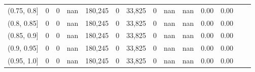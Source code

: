 \begin{tabular}{rrrrrrrrrrrrrr}
(0.75, 0.8]    &        0 &       0 &    nan &  180,245 &        0 &  33,825 &       0 &   nan &   nan &  0.00 &      0.00 \\
(0.8, 0.85]    &        0 &       0 &    nan &  180,245 &        0 &  33,825 &       0 &   nan &   nan &  0.00 &      0.00 \\
(0.85, 0.9]    &        0 &       0 &    nan &  180,245 &        0 &  33,825 &       0 &   nan &   nan &  0.00 &      0.00 \\
(0.9, 0.95]    &        0 &       0 &    nan &  180,245 &        0 &  33,825 &       0 &   nan &   nan &  0.00 &      0.00 \\
(0.95, 1.0]    &        0 &       0 &    nan &  180,245 &        0 &  33,825 &       0 &   nan &   nan &  0.00 &      0.00 \\
\bottomrule
\end{tabular}
